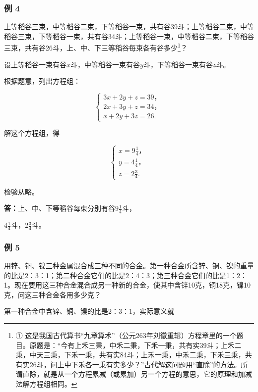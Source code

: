 \subsubsection{例 4}

上等稻谷三束，中等稻谷二束，下等稻谷一束，共有谷39斗；上等稻谷二束，中等稻谷三束，下等稻谷一束，共有谷34斗；上等稻谷一束，中等稻谷二束，下等稻谷三束，共有谷26斗，上、中、下三等稻谷每束各有谷多少\footnote{①
  这是我国古代算书``九章算术''（公元263年刘徽重辑）方程章里的一个题目。原题是：``今有上禾三秉，中禾二秉，下禾一秉，共有实39斗；上禾二秉，中天三秉，下禾一秉，共有实84斗；上禾一秉，中禾二秉，下禾三秉，共有实26斗，问上中下禾各一秉有实多少？''古代解这问题用``直除''的方法。所谓直除，就是从一个方程累减（或累加）另一个方程的意思，它的原理和加减法解方程组相同。}？

设上等稻谷一束有谷\(x\)斗，中等稻谷一束有谷\(y\)斗，下等稻谷一束有谷\(z\)斗。

根据题意，列出方程组：

\[
\left\{ \begin{array}{l} 3 x + 2 y + z = 39\text{，} \\ 2 x + 3 y + z = 34\text{，} \\ x + 2 y + 3 z = 26. \end{array} \right. \tag{1}
\]

解这个方程组，得

\[
\left\{ \begin{array}{l} x = 9 \frac{1}{4}\text{，} \\ y = 4 \frac{1}{4}\text{，} \\ z = 2 \frac{3}{4}. \end{array} \right.
\]

检验从略。

\textbf{答：}上、中、下等稻谷每束分别有谷\(9\frac{1}{4}\)斗，

\(4\frac{1}{4}\)斗，\(2\frac{3}{4}\)斗。

\subsubsection{例 5}

用锌、铜、镍三种金属混合成三种不同的合金。第一种合金所含锌、铜、镍的重量的比是2：3：1；第二种合金它们的比是2：4：3；第三种合金它们的比是1：2：1。现在要用这三种合金混合成另一种新的合金，使其中含锌10克，铜18克，镍10克，问这三种合金各用多少克？

 第一种合金中含锌、铜、镍的比是2：3：1，实际意义就


